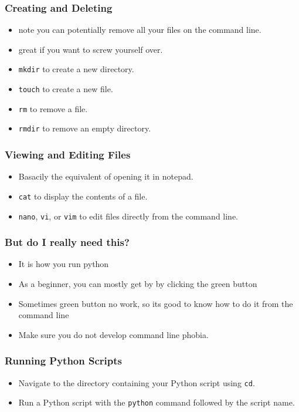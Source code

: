 \documentclass[aspectratio=169,hyperref={unicode}]{beamer}
\begin{document}
\begin{frame}[fragile]
\frametitle{Creating and Deleting}
\begin{itemize}
        \item note you can potentially remove all your files on the command line.
        \item great if you want to screw yourself over.
\item \texttt{mkdir} to create a new directory.
\item \texttt{touch} to create a new file.
\item \texttt{rm} to remove a file.
\item \texttt{rmdir} to remove an empty directory.
\end{itemize}
\end{frame}

\begin{frame}[fragile]
\frametitle{Viewing and Editing Files}
\begin{itemize}
\item Basacily the equivalent of opening it in notepad.
\item \texttt{cat} to display the contents of a file.
\item \texttt{nano}, \texttt{vi}, or \texttt{vim} to edit files directly from the command line.
\end{itemize}
\end{frame}


\begin{frame}
\frametitle{But do I really need this?}
\begin{itemize}
        \item It is how you run python
\item As a beginner, you can mostly get by by clicking the green button
\item Sometimes green button no work, so its good to know how to do it from the command line
\item Make sure you do not develop command line phobia.
\end{itemize}
\end{frame}

\begin{frame}[fragile]
\frametitle{Running Python Scripts}
\begin{itemize}
\item Navigate to the directory containing your Python script using \texttt{cd}.
\item Run a Python script with the \texttt{python} command followed by the script name.
\end{itemize}
\end{frame}
\end{document}
